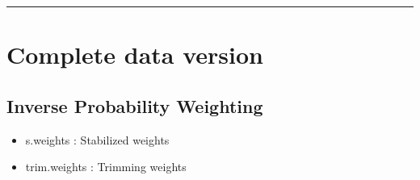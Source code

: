 \documentclass[
]{book}
\providecommand{\tightlist}{%
  \setlength{\itemsep}{0pt}\setlength{\parskip}{0pt}}
\begin{document}
\begin{center}\rule{0.5\linewidth}{0.5pt}\end{center}

\hypertarget{complete-data-version-1}{%
\section{Complete data version}\label{complete-data-version-1}}

\hypertarget{inverse-probability-weighting}{%
\subsection{Inverse Probability Weighting}\label{inverse-probability-weighting}}

\begin{itemize}
\tightlist
\item
  s.weights : Stabilized weights\\
\item
  trim.weights : Trimming weights
\end{itemize}
\end{document}
